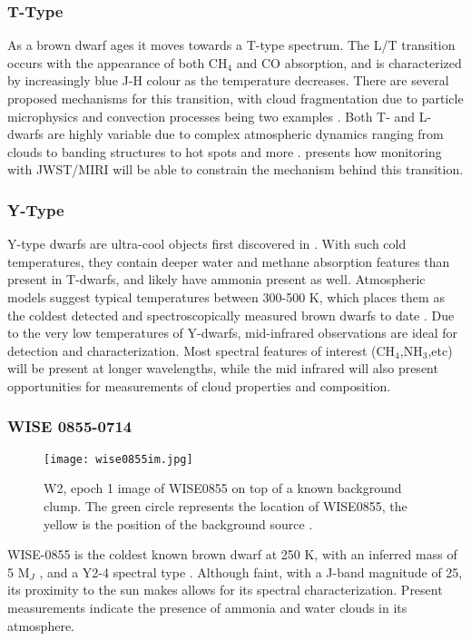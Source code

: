 \subsubsection{T-Type}
As a brown dwarf ages it moves towards a T-type spectrum. 
The L/T transition occurs  with the appearance of both CH$_{4}$ and CO absorption, and is characterized by increasingly blue J-H colour as the temperature decreases.
There are several proposed mechanisms for this transition, with cloud fragmentation due to particle microphysics \parencite{Burningham2017} and convection processes being two examples \parencite{Tremblin2015}.
Both T- and L-dwarfs are highly variable due to complex atmospheric dynamics ranging from clouds to banding structures to hot spots and more \parencite{Biller2017}.
\parencite{Vos2019} presents how monitoring with JWST/MIRI will be able to constrain the mechanism behind this transition.
\subsubsection{Y-Type}
Y-type dwarfs are ultra-cool objects first discovered in \parencite{Cushing2011}. 
With such cold temperatures, they contain deeper water and methane absorption features than present in T-dwarfs, and likely have ammonia present as well.
Atmospheric models suggest typical temperatures between 300-500 K, which places them as the coldest detected and spectroscopically measured brown dwarfs to date \parencite{Cushing2011}.
Due to the very low temperatures of Y-dwarfs, mid-infrared observations are ideal for detection and characterization.
Most spectral features of interest (CH$_{4}$,NH$_{3}$,etc) will be present at longer wavelengths, while the mid infrared will also present opportunities for measurements of cloud properties and composition.

\clearpage
\subsubsection{WISE 0855-0714}
\begin{wrapfigure}{r}{5.5cm}
	\centering
	\vspace{-1em}
	\texttt{[image: wise0855im.jpg]}
	\caption{W2, epoch 1 image of WISE0855 on top of a known background clump. The green circle represents the location of WISE0855, the yellow is the position of the background source \parencite{Wright2014}. }
	\label{fig:wise0855im}
\end{wrapfigure}
WISE-0855 is the coldest known brown dwarf at 250 K, with an inferred mass of 5 M$_{J}$ \parencite{Luhman2014}, and a Y2-4 spectral type \parencite{Leggett2015}.
Although faint, with a J-band magnitude of 25, its proximity to the sun makes allows for its spectral characterization.
Present measurements indicate the presence of ammonia \parencite{Leggett2015} and water clouds \parencite{Morley2014,Faherty2018} in its atmosphere.

